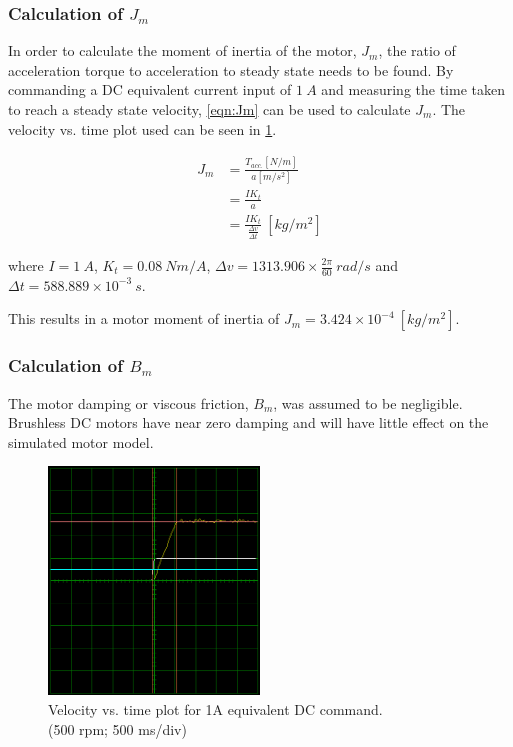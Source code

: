 \subsubsection{Calculation of $J_m$}
In order to calculate the moment of inertia of the motor, $J_m$, the ratio of acceleration torque to acceleration to steady state needs to be found. By commanding a DC equivalent current input of $1\ A$ and measuring the time taken to reach a steady state velocity, \cref{eqn:Jm} can be used to calculate $J_m$. The velocity vs. time plot used can be seen in \cref{fig:jm-plots}.

\begin{equation} \label{eqn:Jm}
\begin{aligned}
J_m &= \frac{T_{acc.}[N/m]}{a[m/s^2]} \\
&= \frac{IK_t}{a} \\
&= \frac{IK_t}{\frac{\Delta v}{\Delta t}}\ [kg/m^2]
\end{aligned}
\end{equation}

where $I=1\ A$, $K_t=0.08\ Nm/A$, $\Delta v = 1313.906\times \frac{2\pi}{60}\ rad/s$ and $\Delta t = 588.889\times10^{-3}\ s$.

This results in a motor moment of inertia of $J_m = 3.424 \times 10^{-4}\ [kg/m^2]$.

\subsubsection{Calculation of $B_m$}

The motor damping or viscous friction, $B_m$, was assumed to be negligible. Brushless DC motors have near zero damping and will have little effect on the simulated motor model.

\begin{figure}
\centering
\includegraphics[width=0.5\textwidth]{images/driveware/current-velocity-response} 
\caption{Velocity vs. time plot for 1A equivalent DC command.\\
(500 rpm; 500 ms/div)}
\label{fig:jm-plots}
\end{figure}

